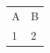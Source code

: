 \documentclass{article}
\begin{document}
\begin{tabular}{ll}
A & B \\
1 & 2 \\
\end{tabular}
\end{document}
